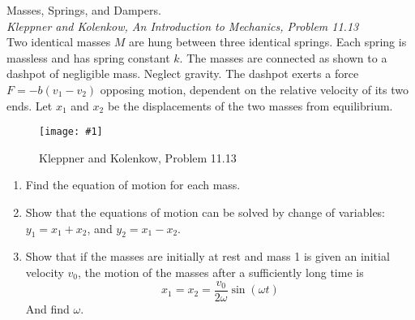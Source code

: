 \documentclass[11pt]{article}
\newcommand{\fig}[4]{
    \begin{figure}[H]
        \centering
        \texttt{[image: \#1]}
        \caption{#2}
        \label{exp4fit}
    \end{figure}
}
\theoremstyle{gangnamstyle}{\newtheorem{definition}{Definition}[]}
\theoremstyle{gangnamstyle}{\newtheorem{example}{Example}[]}
\theoremstyle{gangnamstyle}{\newtheorem{problem}{Problem}[]}
\theoremstyle{gangnamstyle}{\newtheorem{warning}{Warning}[]}
\begin{document}
\begin{problem}
Masses, Springs, and Dampers. \\
\textit{Kleppner and Kolenkow, An Introduction to Mechanics, Problem 11.13} \\
Two identical masses $M$ are hung between three identical springs. Each spring is massless and has spring constant $k$. The masses are connected as shown to a dashpot of negligible mass. Neglect gravity. The dashpot exerts a force $F = -b(v_1 - v_2)$ opposing motion, dependent on the relative velocity of its two ends. Let $x_1$ and $x_2$ be the displacements of the two masses from equilibrium.
\fig{figs/n3/dampers.jpg}{Kleppner and Kolenkow, Problem 11.13}{0.5}{0}
\begin{enumerate}
\item Find the equation of motion for each mass.
\item Show that the equations of motion can be solved by change of variables: $y_1 = x_1 + x_2$, and $y_2 = x_1 - x_2$. 
\item Show that if the masses are initially at rest and mass 1 is given an initial velocity $v_0$, the motion of the masses after a sufficiently long time is
\[ x_1 = x_2 = \frac{v_0}{2\omega}\sin(\omega t) \]
And find $\omega$. 
\end{enumerate}
\end{problem}

\pagebreak
\end{document}
